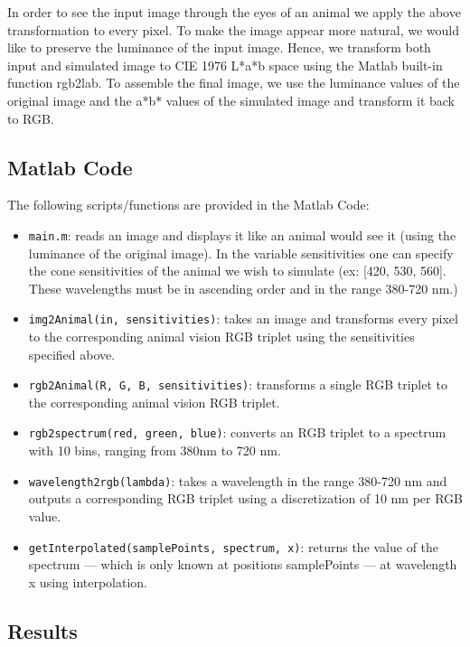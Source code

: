 \documentclass[12pt]{article}
\begin{document}
\vspace{5mm}

In order to see the input image through the eyes of an animal we apply the above transformation to every
pixel. To make the image appear more natural, we would like to preserve the luminance of the input image.
Hence, we transform both input and simulated image to CIE 1976 L*a*b space using the Matlab built-in
function rgb2lab. To assemble the final image, we use the luminance values of the original image and the
a*b* values of the simulated image and transform it back to RGB.

\subsection{Matlab Code}

The following scripts/functions are provided in the Matlab Code:

\begin{itemize}
\item \verb|main.m|: reads an image and displays it like an animal would see it (using the luminance of the original
image). In the variable sensitivities one can specify the cone sensitivities of the animal we wish to
simulate (ex: [420, 530, 560]. These wavelengths must be in ascending order and in the range 380-720
nm.)
\item \verb|img2Animal(in, sensitivities)|: takes an image and transforms every pixel to the corresponding animal
vision RGB triplet using the sensitivities specified above.
\item \verb|rgb2Animal(R, G, B, sensitivities)|: transforms a single RGB triplet to the corresponding animal vision RGB
triplet.
\item \verb|rgb2spectrum(red, green, blue)|: converts an RGB triplet to a spectrum with 10 bins, ranging from 380nm
to 720 nm.
\item \verb|wavelength2rgb(lambda)|: takes a wavelength in the range 380-720 nm and outputs a corresponding
RGB triplet using a discretization of 10 nm per RGB value.
\item \verb|getInterpolated(samplePoints, spectrum, x)|: returns the value of the spectrum — which is only known at
positions samplePoints — at wavelength x using interpolation.
\end{itemize}

\subsection{Results}
\end{document}
